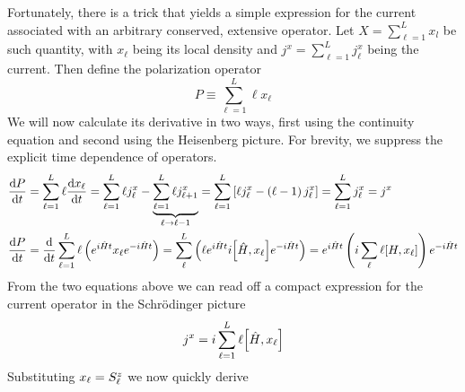 Fortunately, there is a trick that yields a simple expression for the current
associated with an arbitrary conserved, extensive operator. Let \(X = \sum^{L}_{\ell=1}x_l\) be such quantity,
with \(x_{\ell}\) being its local density and \(j^x = \sum^{L}_{\ell=1} j^x_{\ell}\) being the current.
Then define the polarization operator
\begin{equation}
    P \equiv  \sum^{L}_{\ell=1}\ell x_{\ell} 
\end{equation}
We will now calculate its derivative in two ways, first using the continuity equation and second using
the Heisenberg picture. For brevity, we suppress the explicit time dependence of operators.
\begin{align}
    \dv{P}{t} & = \sum^{L}_{\ell=1} \ell \dv{x_{\ell}}{t} =
    \sum^{L}_{\ell=1} \ell j^x_{\ell} - \underbrace{\sum_{\ell=1}^{L} \ell j^x_{\ell+1}}_{\ell \to \ell - 1}
    = \sum_{\ell=1}^{L} \left[\ell j^x_{\ell} - \left(\ell-1\right)j^{x}_{\ell}\right]
    = \sum_{\ell=1}^L j^x_{\ell} = j^x                                                    \\
    \dv{P}{t} & = \dv{t} \sum_{\ell=1}^L \ell \left(e^{i \hat{H}  t}x_{\ell} e^{-i \hat{H}  t}\right) =
    \sum_{\ell}^{L} \left(\ell e^{i \hat{H}  t} i \comm{\hat{H} }{x_{\ell}}e^{-i \hat{H}  t}\right) =
    e^{i \hat{H}  t} \left(i \sum_{\ell} \ell \comm{H}{x_{\ell}}\right)e^{-i \hat{H}  t}
\end{align}
From the two equations above we can read off a compact expression for the current operator in the Schr{\"o}dinger
picture
\begin{equation}
    j^x = i \sum_{\ell=1}^L \ell\comm{\hat{H} }{x_{\ell}}
    \label{eq:polarization}
\end{equation}
Substituting \(x_{\ell} = S^{z}_{\ell}\) we now quickly derive
